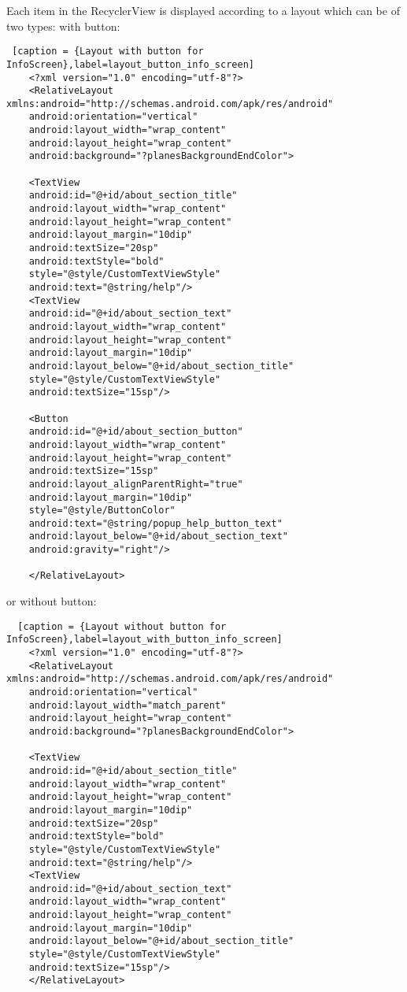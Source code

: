 Each item in the RecyclerView is displayed according to a layout which can be of two types: with button:

\begin{lstlisting} [caption = {Layout with button for InfoScreen},label=layout_button_info_screen]
	<?xml version="1.0" encoding="utf-8"?>
	<RelativeLayout xmlns:android="http://schemas.android.com/apk/res/android"
	android:orientation="vertical"
	android:layout_width="wrap_content"
	android:layout_height="wrap_content"
	android:background="?planesBackgroundEndColor">
	
	<TextView
	android:id="@+id/about_section_title"
	android:layout_width="wrap_content"
	android:layout_height="wrap_content"
	android:layout_margin="10dip"
	android:textSize="20sp"
	android:textStyle="bold"
	style="@style/CustomTextViewStyle"
	android:text="@string/help"/>
	<TextView
	android:id="@+id/about_section_text"
	android:layout_width="wrap_content"
	android:layout_height="wrap_content"
	android:layout_margin="10dip"
	android:layout_below="@+id/about_section_title"
	style="@style/CustomTextViewStyle"
	android:textSize="15sp"/>
	
	<Button
	android:id="@+id/about_section_button"
	android:layout_width="wrap_content"
	android:layout_height="wrap_content"
	android:textSize="15sp"
	android:layout_alignParentRight="true"
	android:layout_margin="10dip"
	style="@style/ButtonColor"
	android:text="@string/popup_help_button_text"
	android:layout_below="@+id/about_section_text"
	android:gravity="right"/>
	
	</RelativeLayout>
\end{lstlisting}

or without button:

\begin{lstlisting}  [caption = {Layout without button for InfoScreen},label=layout_with_button_info_screen]
	<?xml version="1.0" encoding="utf-8"?>
	<RelativeLayout xmlns:android="http://schemas.android.com/apk/res/android"
	android:orientation="vertical"
	android:layout_width="match_parent"
	android:layout_height="wrap_content"
	android:background="?planesBackgroundEndColor">
	
	<TextView
	android:id="@+id/about_section_title"
	android:layout_width="wrap_content"
	android:layout_height="wrap_content"
	android:layout_margin="10dip"
	android:textSize="20sp"
	android:textStyle="bold"
	style="@style/CustomTextViewStyle"
	android:text="@string/help"/>
	<TextView
	android:id="@+id/about_section_text"
	android:layout_width="wrap_content"
	android:layout_height="wrap_content"
	android:layout_margin="10dip"
	android:layout_below="@+id/about_section_title"
	style="@style/CustomTextViewStyle"
	android:textSize="15sp"/>
	</RelativeLayout>
\end{lstlisting}

